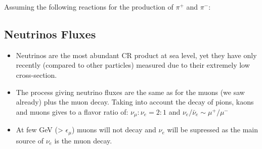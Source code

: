 \documentclass[
  letterpaper,
  DIV=11,
  numbers=noendperiod]{scrreprt}
\begin{document}
Assuming the following reactions for the production of \(\pi^+\) and
\(\pi^{-}\):

\subsection*{Neutrinos Fluxes}\label{neutrinos-fluxes}

\begin{itemize}
\item
  Neutrinos are the most abundant CR product at sea level, yet they have
  only recently (compared to other particles) measured due to their
  extremely low cross-section.
\item
  The process giving neutrino fluxes are the same as for the muons (we
  saw already) plus the muon decay. Taking into account the decay of
  pions, kaons and muons gives to a flavor ratio of:
  \(\nu_\mu : \nu_e = 2:1\) and \(\nu_e/{\bar \nu_e} \sim \mu^+/\mu^-\)
\item
  At few GeV (\textgreater{} \(\epsilon_\mu\)) muons will not decay and
  \(\nu_e\) will be supressed as the main source of \(\nu_e\) is the
  muon decay.
\end{itemize}
\end{document}
